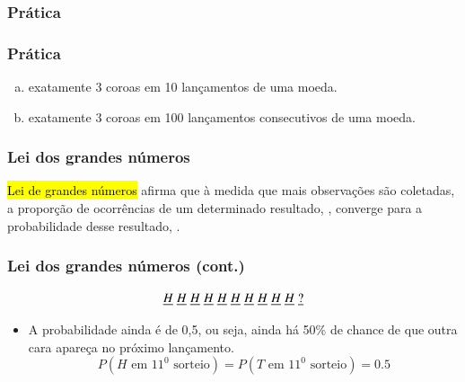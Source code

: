 
\begin{frame}
\frametitle{Prática}
\frametitle{Prática}
\justifying
{}

\begin{enumerate}[(a)]
\justifying
\item exatamente 3 coroas em 10 lançamentos de uma moeda.
\justifying
\item exatamente 3 coroas em 100 lançamentos consecutivos de uma moeda.
\justifying
{}
\end{enumerate}

\end{frame}


\begin{frame}
\frametitle{Lei dos grandes números}
\justifying
\hl{Lei de grandes números} afirma que à medida que mais observações são coletadas, a proporção de ocorrências de um determinado resultado, , converge para a probabilidade desse resultado, .

\end{frame}


\begin{frame}
\frametitle{Lei dos grandes números (cont.)}
\justifying
{}
\[ \underline{H} \hspace{1mm} \underline{H} \hspace{1mm} \underline{H} \hspace{1mm} \underline{H} \hspace{1mm} \underline{H} \hspace{1mm} \underline{H} \hspace{1mm} \underline{H} \hspace{1mm} \underline{H} \hspace{1mm} \underline{H} \hspace{1mm} \underline{H} \hspace{1mm} \underline{?} \]
\small{
\begin{itemize}
\justifying
\item<2-> A probabilidade ainda é de 0,5, ou seja, ainda há 50\% de chance de que outra cara apareça no próximo lançamento.
\[ P(H \text{ em 11}^{0} \text{ sorteio}) = P(T \text{ em 11}^{0} \text{ sorteio}) = 0.5 \]
\end{itemize}
}
\end{frame}


